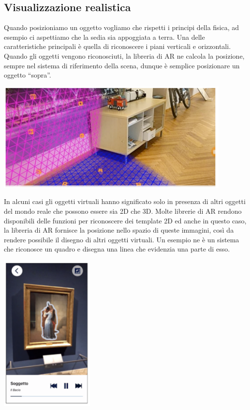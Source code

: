 \subsection{Visualizzazione realistica}
Quando posizioniamo un oggetto vogliamo che rispetti i principi della fisica, ad esempio ci aspettiamo che la sedia sia appoggiata a terra. 
Una delle caratteristiche principali è quella di riconoscere i piani verticali e orizzontali. 
Quando gli oggetti vengono riconosciuti, la libreria di AR ne calcola la posizione, sempre nel sistema di riferimento della scena, dunque è semplice posizionare un oggetto “sopra”.
\begin{center}
    \includegraphics[width=.6\textwidth]{images/MobiDEV/4. augmented reality (display e interaction)/piano.PNG}
\end{center}


\begin{minipage}{.4\textwidth}
   In alcuni casi gli oggetti virtuali hanno significato solo in presenza di altri oggetti del mondo reale che possono essere sia 2D che 3D. Molte librerie di AR rendono disponibili delle funzioni per riconoscere dei template 2D ed anche in questo caso, la libreria di AR fornisce la posizione nello spazio di queste immagini, così da rendere possibile il disegno di altri oggetti virtuali. Un esempio ne è un sistema che riconosce un quadro e disegna una linea che evidenzia una parte di esso. 
\end{minipage} 
\hfill
\begin{minipage}{.6\textwidth}
    \begin{center}
        \includegraphics[width=.5\textwidth]{images/MobiDEV/4. augmented reality (display e interaction)/template 2D.PNG}
    \end{center}
\end{minipage}

